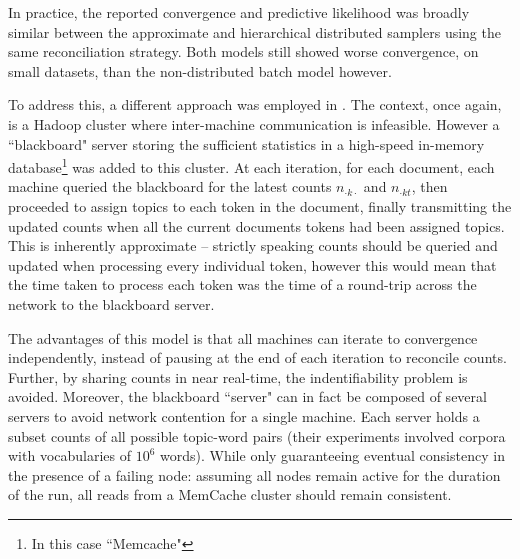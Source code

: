 In practice, the reported convergence and predictive likelihood was broadly similar between the approximate and hierarchical distributed samplers using the same reconciliation strategy. Both models still showed worse convergence, on small datasets, than the non-distributed batch model however.

To address this, a different approach was employed in \cite{Smola2010}. The context, once again, is a Hadoop cluster where inter-machine communication is infeasible. However a ``blackboard" server storing the sufficient statistics in a high-speed in-memory database\footnote{In this case ``Memcache"} was added to this cluster. At each iteration, for each document, each machine queried the blackboard for the latest counts $n_{\cdot k \cdot}$ and $n_{\cdot k t}$, then proceeded to assign topics to each token in the document, finally transmitting the updated counts when all the current documents tokens had been assigned topics. This is inherently approximate -- strictly speaking counts should be queried and updated when processing every individual token, however this would mean that the time taken to process each token was the time of a round-trip across the network to the blackboard server.

The advantages of this model is that all machines can iterate to convergence independently, instead of pausing at the end of each iteration to reconcile counts. Further, by sharing counts in near real-time, the indentifiability problem is avoided. Moreover, the blackboard ``server" can in fact be composed of several servers to avoid network contention for a single machine. Each server holds a subset counts of all possible topic-word pairs (their experiments involved corpora with vocabularies of $10^6$ words). While only guaranteeing eventual consistency in the presence of a failing node: assuming all nodes remain active for the duration of the run, all reads from a MemCache cluster should remain consistent. 

